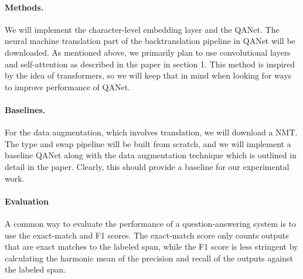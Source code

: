 \documentclass{article}
\begin{document}
\paragraph{Methods.}
We will implement the character-level embedding layer and the QANet. The neural machine translation part of the backtranslation pipeline in QANet will be downloaded. As mentioned above, we primarily plan to use convolutional layers and self-attention as described in the paper in section 1. This method is inspired by the idea of transformers, so we will keep that in mind when looking for ways to improve performance of QANet.

\paragraph{Baselines.}
For the data augmentation, which involves translation, we will download a NMT. The type and swap pipeline will be built from scratch, and we will implement a baseline QANet along with the data augmentation technique which is outlined in detail in the paper. Clearly, this should provide a baseline for our experimental work.

\paragraph{Evaluation}
A common way to evaluate the performance of a question-answering system is to use the exact-match and F1 scores. The exact-match score only counts outputs that are exact matches to the labeled span, while the F1 score is less stringent by calculating the harmonic mean of the precision and recall of the outputs against the labeled span.



\end{document}

